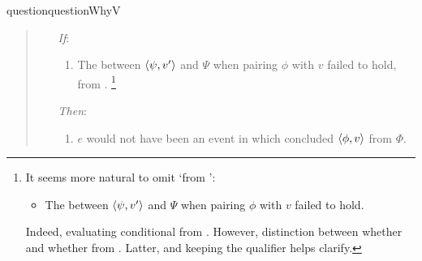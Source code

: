 \begin{note}
\begin{restatable}[\qWhyV{}]{question}{questionWhyV}
\begin{quote}
      \begin{enumerate}
      \item[\emph{If}:]
        \begin{enumerate}[label=\alph*., ref=(\alph*), resume*=qWhyVDef]
        \item
          The  between \(\langle \psi, v' \rangle\) and \(\Psi\) when pairing \(\phi\) with \(v\) failed to hold, from .%
          \footnote{
            It seems more natural to omit `from ':
            \begin{itemize}
            \item
              The  between \(\langle \psi, v' \rangle\) and \(\Psi\) when pairing \(\phi\) with \(v\) failed to hold.
            \end{itemize}
            Indeed, evaluating conditional from \agpe{}.
            However, distinction between whether \ros{} and whether \ros{} from \agpe{}.
            Latter, and keeping the qualifier helps clarify.
          }
        \end{enumerate}
      \item[\emph{Then}:]
        \begin{enumerate}[label=\alph*., ref=(\alph*), resume*=qWhyVDef]
        \item
          \(e\) would not have been an event in which \vAgent{} concluded \(\langle \phi, v \rangle\) from \(\Phi\).
        \end{enumerate}
      \end{enumerate}
    \end{quote}
    \vspace{-\baselineskip}
  \end{restatable}
\end{note}

